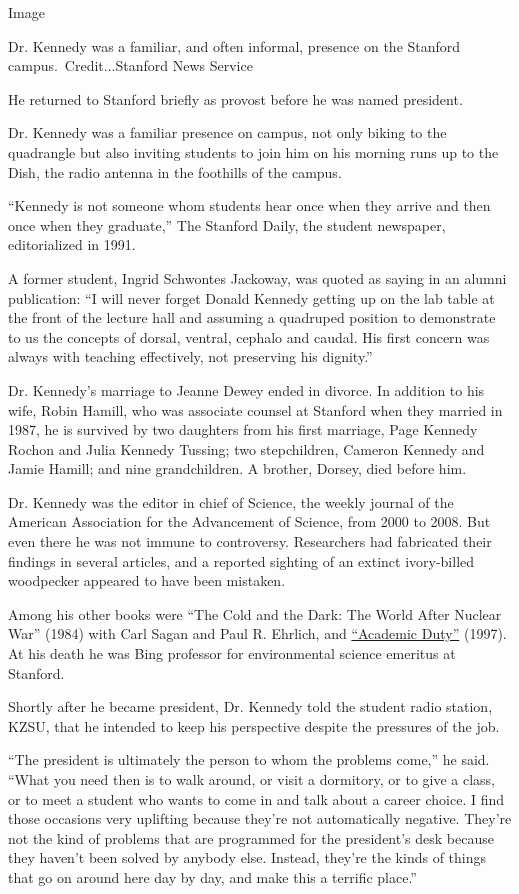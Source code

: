 Image

Dr. Kennedy was a familiar, and often informal, presence on the Stanford
campus.~Credit...Stanford News Service

He returned to Stanford briefly as provost before he was named
president.

Dr. Kennedy was a familiar presence on campus, not only biking to the
quadrangle but also inviting students to join him on his morning runs up
to the Dish, the radio antenna in the foothills of the campus.

``Kennedy is not someone whom students hear once when they arrive and
then once when they graduate,'' The Stanford Daily, the student
newspaper, editorialized in 1991.

A former student, Ingrid Schwontes Jackoway, was quoted as saying in an
alumni publication: ``I will never forget Donald Kennedy getting up on
the lab table at the front of the lecture hall and assuming a quadruped
position to demonstrate to us the concepts of dorsal, ventral, cephalo
and caudal. His first concern was always with teaching effectively, not
preserving his dignity.''

Dr. Kennedy's marriage to Jeanne Dewey ended in divorce. In addition to
his wife, Robin Hamill, who was associate counsel at Stanford when they
married in 1987, he is survived by two daughters from his first
marriage, Page Kennedy Rochon and Julia Kennedy Tussing; two
stepchildren, Cameron Kennedy and Jamie Hamill; and nine grandchildren.
A brother, Dorsey, died before him.

Dr. Kennedy was the editor in chief of Science, the weekly journal of
the American Association for the Advancement of Science, from 2000 to
2008. But even there he was not immune to controversy. Researchers had
fabricated their findings in several articles, and a reported sighting
of an extinct ivory-billed woodpecker appeared to have been mistaken.

Among his other books were ``The Cold and the Dark: The World After
Nuclear War'' (1984) with Carl Sagan and Paul R. Ehrlich, and
\href{https://www.nytimes3xbfgragh.onion/1998/01/04/books/beyond-the-culture-wars.html}{``Academic
Duty''} (1997). At his death he was Bing professor for environmental
science emeritus at Stanford.

Shortly after he became president, Dr. Kennedy told the student radio
station, KZSU, that he intended to keep his perspective despite the
pressures of the job.

``The president is ultimately the person to whom the problems come,'' he
said. ``What you need then is to walk around, or visit a dormitory, or
to give a class, or to meet a student who wants to come in and talk
about a career choice. I find those occasions very uplifting because
they're not automatically negative. They're not the kind of problems
that are programmed for the president's desk because they haven't been
solved by anybody else. Instead, they're the kinds of things that go on
around here day by day, and make this a terrific place.''

